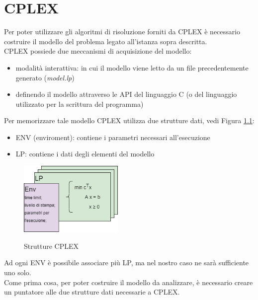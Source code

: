 \chapter{CPLEX}

Per poter utilizzare gli algoritmi di risoluzione forniti da CPLEX è necessario costruire il modello del problema legato all'istanza sopra descritta.\\
CPLEX possiede due meccanismi di acquisizione del modello:

\begin{itemize}
\item{modalità interattiva: in cui il modello viene letto da un file precedentemente generato (\textit{model.lp})}
\item{definendo il modello attraverso le API del linguaggio C (o del linguaggio utilizzato per la scrittura del programma)}
\end{itemize}

Per memorizzare tale modello CPLEX utilizza due strutture dati, vedi Figura \ref{strutture_cplex}:

\begin{itemize}
\item{ENV (enviroment): contiene i parametri necessari all'esecuzione}
\item{LP: contiene i dati degli elementi del modello}
\end{itemize}

\begin{figure}[h] 
\begin{center} 
  \includegraphics[width=5cm]{Images/cplex_structs}\\ 
  \caption{\footnotesize{Strutture CPLEX}}
  \label{strutture_cplex} 
\end{center} 
\end{figure}

Ad ogni ENV è possibile associare più LP, ma nel nostro caso ne sarà sufficiente uno solo.\\
Come prima cosa, per poter costruire il modello da analizzare, è necessario creare un puntatore alle due strutture dati necessarie a CPLEX.

